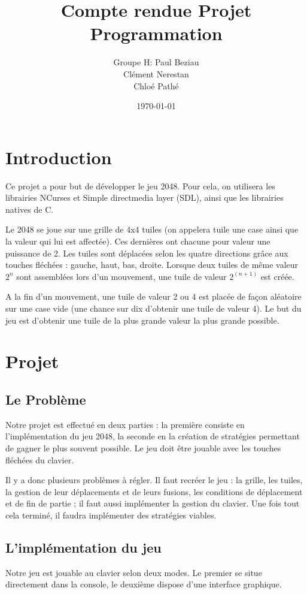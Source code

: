 \documentclass[12pt]{report}
\title{Compte rendue Projet Programmation}
\author{Groupe H:
 Paul Beziau\\
 Clément Nerestan\\
 Chloé Pathé\\
 }
\date{\today}
\begin{document}
\maketitle

\tableofcontents

\chapter{Introduction}
Ce projet a pour but de développer le jeu 2048. Pour cela, on utilisera les librairies NCurses et Simple directmedia layer (SDL), ainsi que les librairies natives de C.\cite{ref1}

Le 2048 se joue sur une grille de 4x4 tuiles (on appelera tuile une case ainsi que la valeur qui lui est affectée). Ces dernières ont chacune pour valeur une puissance de 2. Les tuiles sont déplacées selon les quatre directions grâce aux touches fléchées : gauche, haut, bas, droite. Lorsque deux tuiles de même valeur $2^n$ sont assemblées lors d’un mouvement, une tuile de valeur $2^{(n+1)}$ est créée.

A la fin d’un mouvement, une tuile de valeur 2 ou 4 est placée de façon aléatoire sur une case vide (une chance sur dix d’obtenir une tuile de valeur 4).
Le but du jeu est d’obtenir une tuile de la plus grande valeur la plus grande possible. \cite{ref2}

\chapter{Projet}
\section{Le Problème}
Notre projet est effectué en deux parties : la première consiste en l’implémentation du jeu 2048, la seconde en la création de stratégies permettant de gagner le plus souvent possible. Le jeu doit être jouable avec les touches fléchées du clavier.

Il y a donc plusieurs problèmes à régler. Il faut recréer le jeu : la grille, les tuiles, la gestion de leur déplacements et de leurs fusions, les conditions de déplacement et de fin de partie ; il faut aussi implémenter la gestion du clavier. Une fois tout cela terminé, il faudra implémenter des stratégies viables.

\section{L’implémentation du jeu}
Notre jeu est jouable au clavier selon deux modes. Le premier se situe directement dans la console, le deuxième dispose d’une interface graphique. 
\end{document}
